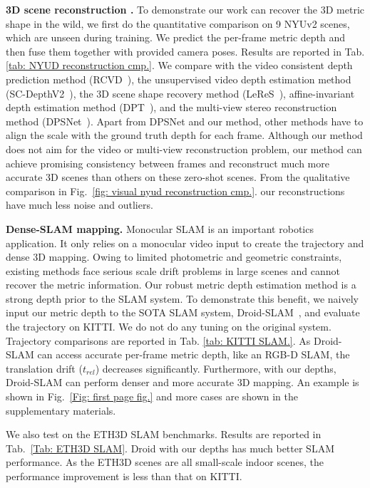 \noindent\textbf{3D scene reconstruction .}
To demonstrate our work can recover the 3D metric shape in the wild, we first do the quantitative comparison on 9 NYUv2 scenes, which are unseen during training. We predict the per-frame metric depth and then fuse them together with provided camera poses. Results are reported in Tab. \ref{tab: NYUD reconstruction cmp.}. We compare with the video consistent depth prediction method (RCVD~\cite{kopf2021rcvd}), the unsupervised video depth estimation method (SC-DepthV2~\cite{bian2021tpami}), the 3D scene shape recovery method (LeReS~\cite{leres}), affine-invariant depth estimation method (DPT~\cite{ranftl2021vision}), and the multi-view stereo reconstruction method (DPSNet~\cite{im2019dpsnet}). Apart from DPSNet and our method, other methods have to align the scale with the ground truth depth for each frame. Although our method does not aim for the video or multi-view reconstruction problem, our method can achieve promising consistency between frames and reconstruct much more accurate 3D scenes than others on these zero-shot scenes.  From the qualitative comparison in Fig.~\ref{fig: visual nyud reconstruction cmp.}. our reconstructions have much less noise and outliers. 

\noindent\textbf{Dense-SLAM mapping.}
Monocular SLAM is an important robotics application. It only relies on a monocular video input to create the trajectory and dense 3D mapping. Owing to limited photometric and geometric constraints, existing methods face serious scale drift problems in large scenes and cannot recover the metric information. Our robust metric depth estimation method is a strong depth prior to the SLAM system. To demonstrate this benefit,  we naively input our metric depth to the SOTA SLAM system, Droid-SLAM~\cite{teed2021droid}, and evaluate the trajectory on KITTI. We do not do any tuning on the original system. Trajectory comparisons are reported in Tab. \ref{tab: KITTI SLAM.}. As Droid-SLAM can access accurate per-frame metric depth, like an RGB-D SLAM, the translation drift ($t_{rel}$) decreases significantly. Furthermore, with our depths, Droid-SLAM can perform denser and more accurate 3D mapping. An example is shown in Fig.~\ref{Fig: first page fig.} and more cases are shown in the supplementary materials.   

We also test on the ETH3D SLAM benchmarks. Results are reported in Tab.~\ref{Tab: ETH3D SLAM}. Droid with our depths has much better SLAM performance. As the ETH3D scenes are all small-scale indoor scenes, the performance improvement is less than that on KITTI. 

